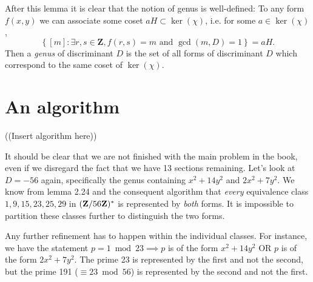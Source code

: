 After this lemma it is clear that the notion of genus is well-defined: To any form $f(x,y)$ we can associate some coset $aH\subset\ker(\chi)$, i.e. for some $a\in\ker(\chi)$,
\[\left\{[m]:\exists r,s\in\mathbf{Z}, f(r,s)=m\text{ and }\gcd(m,D)=1\right\}=aH.\]
Then a \emph{genus} of discriminant $D$ is the set of all forms of discriminant $D$ which correspond to the same coset of $\ker(\chi)$.

\section{An algorithm}

((Insert algorithm here))

It should be clear that we are not finished with the main problem in the book, even if we disregard the fact that we have 13 sections remaining. Let's look at $D=-56$ again, specifically the genus containing $x^2+14y^2$ and $2x^2+7y^2$. We know from lemma 2.24 and the consequent algorithm that \emph{every} equivalence class $1, 9, 15, 23, 25, 29$ in $(\mathbf{Z}/56\mathbf{Z})^*$ is represented by \emph{both} forms. It is impossible to partition these classes further to distinguish the two forms.

Any further refinement has to happen within the individual classes. For instance, we have the statement $p=1\bmod 23\implies p$ is of the form $x^2+14y^2$ OR $p$ is of the form $2x^2+7y^2$. The prime 23 is represented by the first and not the second, but the prime 191 ($\equiv 23\bmod 56$) is represented by the second and not the first.


